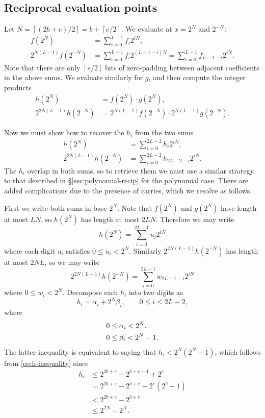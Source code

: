 \documentclass{amsart}
\newcommand{\ceil}[1]{\left\lceil{#1}\right\rceil}
\theoremstyle{definition}
\theoremstyle{remark}
\begin{document}
\subsection{Reciprocal evaluation points}
\label{sec:integer-recip}

Let $N = \ceil{(2b+e)/2} = b + \ceil{e/2}$. We evaluate at $x = 2^N$ and $2^{-N}$:
\begin{align*}
 f(2^N) & = \sum_{i=0}^{L-1} f_i 2^{iN}, \\
 2^{N(L-1)} f(2^{-N}) & = \sum_{i=0}^{L-1} f_i 2^{(L-1-i)N} = \sum_{i=0}^{L-1} f_{L-1-i} 2^{iN}.
\end{align*}
Note that there are only $\ceil{e/2}$ bits of zero-padding between adjacent coefficients in the above sums. We evaluate similarly for $g$, and then compute the integer products
\begin{align*}
  h(2^N) & = f(2^N) \cdot g(2^N), \\
  2^{2N(L-1)} h(2^{-N}) & = 2^{N(L-1)} f(2^{-N}) \cdot 2^{N(L-1)} g(2^{-N}).
\end{align*}

Now we must show how to recover the $h_i$ from the two sums
\begin{align}
 h(2^N) & = \sum_{i=0}^{2L-2} h_i 2^{iN}, \label{eq:overlap-1} \\
 2^{2N(L-1)} h(2^{-N}) & = \sum_{i=0}^{2L-2} h_{2L-2-i} 2^{iN}. \label{eq:overlap-2}
\end{align}
The $h_i$ overlap in both sums, so to retrieve them we must use a similar strategy to that described in \S\ref{sec:polynomial-recip} for the polynomial case. There are added complications due to the presence of carries, which we resolve as follows.

First we write both sums in base $2^N$. Note that $f(2^N)$ and $g(2^N)$ have length at most $LN$, so $h(2^N)$ has length at most $2LN$. Therefore we may write
\begin{equation}
\label{eq:digits-1}
 h(2^N) = \sum_{i=0}^{2L-1} u_i 2^{iN}
\end{equation}
where each digit $u_i$ satisfies $0 \leq u_i < 2^N$. Similarly $2^{2N(L-1)} h(2^{-N})$ has length at most $2NL$, so we may write
\begin{equation}
\label{eq:digits-2}
 2^{2N(L-1)} h(2^{-N}) = \sum_{i=0}^{2L-1} w_{2L-1-i} 2^{iN}
\end{equation}
where $0 \leq w_i < 2^N$. Decompose each $h_i$ into two digits as
 \[ h_i = \alpha_i + 2^N \beta_i, \qquad 0 \leq i \leq 2L-2, \]
where
\begin{align}
 0 & \leq \alpha_i < 2^N, \notag \\
 0 & \leq \beta_i < 2^N - 1. \label{eq:beta-range}
\end{align}
The latter inequality is equivalent to saying that $h_i < 2^N(2^N - 1)$, which follows from \eqref{eq:h-inequality} since
\begin{align*}
 h_i & \leq 2^{2b+e} - 2^{b+e+1} + 2^e \\
     & = 2^{2b+e} - 2^{b+e} - 2^e(2^b - 1) \\
     & < 2^{2b+e} - 2^{b+e} \\
     & \leq 2^{2N} - 2^N.
\end{align*}
\end{document}
